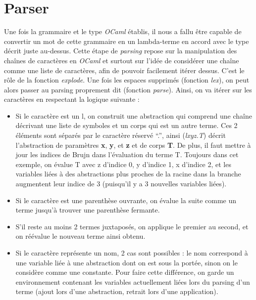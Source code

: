 \documentclass[11pt,a4paper]{report}
\begin{document}
\section{Parser}
\bigskip
Une fois la grammaire et le type \textit{OCaml} établis, il nous a fallu être capable de convertir un mot de cette grammaire en un lambda-terme en accord avec le type décrit juste au-dessus. Cette étape de \textit{parsing} repose sur la manipulation des chaînes de caractères en \textit{OCaml} et surtout sur l'idée de considérer une chaîne comme une liste de caractères, afin de pouvoir facilement itérer dessus. C'est le rôle de la fonction \textit{explode}. Une fois les espaces supprimés (fonction \textit{lex}), on peut alors passer au parsing proprement dit (fonction \textit{parse}). Ainsi, on va itérer sur les caractères en respectant la logique suivante :
\medskip
\begin{itemize}
\item Si le caractère est un l, on construit une abstraction qui comprend une chaîne décrivant une liste de symboles et un corps qui est un autre terme. Ces 2 éléments sont séparés par le caractère réservé ``.'', ainsi (\textit{lxyz.T}) décrit l'abstraction de paramètres \textbf{x}, \textbf{y}, et \textbf{z} et de corps \textbf{T}. De plus, il faut mettre à jour les indices de Brujn dans l'évaluation du terme T. Toujours dans cet exemple, on évalue T avec z d'indice 0, y d'indice 1, x d'indice 2, et les variables liées à des abstractions plus proches de la racine dans la branche augmentent leur indice de 3 (puisqu'il y a 3 nouvelles variables liées).

\item Si le caractère est une parenthèse ouvrante, on évalue la suite comme un terme jusqu'à trouver une parenthèse fermante.

\item S'il reste au moins 2 termes juxtaposés, on applique le premier au second, et on réévalue le nouveau terme ainsi obtenu.

\item Si le caractère représente un nom, 2 cas sont possibles : le nom correspond à une variable liée à une abstraction dont on est sous la portée, sinon on le considère comme une constante. Pour faire cette différence, on garde un environnement contenant les variables actuellement liées lors du parsing d'un terme (ajout lors d'une abstraction, retrait lors d'une application).

\end{itemize}
\end{document}
